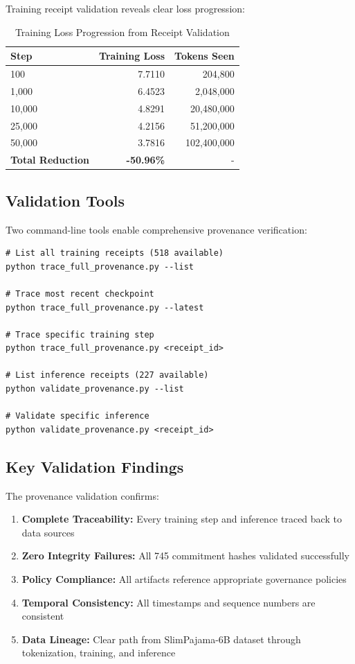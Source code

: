 \documentclass[11pt,a4paper]{article}
\begin{document}
Training receipt validation reveals clear loss progression:

\begin{table}[H]
\centering
\begin{tabular}{lrr}
\toprule
\textbf{Step} & \textbf{Training Loss} & \textbf{Tokens Seen} \\
\midrule
100 & 7.7110 & 204,800 \\
1,000 & 6.4523 & 2,048,000 \\
10,000 & 4.8291 & 20,480,000 \\
25,000 & 4.2156 & 51,200,000 \\
50,000 & 3.7816 & 102,400,000 \\
\midrule
\textbf{Total Reduction} & \textbf{-50.96\%} & - \\
\bottomrule
\end{tabular}
\caption{Training Loss Progression from Receipt Validation}
\label{tab:loss-progression}
\end{table}

\subsection{Validation Tools}

Two command-line tools enable comprehensive provenance verification:

\begin{lstlisting}[basicstyle=\small\ttfamily]
# List all training receipts (518 available)
python trace_full_provenance.py --list

# Trace most recent checkpoint
python trace_full_provenance.py --latest

# Trace specific training step
python trace_full_provenance.py <receipt_id>

# List inference receipts (227 available)
python validate_provenance.py --list

# Validate specific inference
python validate_provenance.py <receipt_id>
\end{lstlisting}

\subsection{Key Validation Findings}

The provenance validation confirms:

\begin{enumerate}
    \item \textbf{Complete Traceability:} Every training step and inference traced back to data sources
    \item \textbf{Zero Integrity Failures:} All 745 commitment hashes validated successfully
    \item \textbf{Policy Compliance:} All artifacts reference appropriate governance policies
    \item \textbf{Temporal Consistency:} All timestamps and sequence numbers are consistent
    \item \textbf{Data Lineage:} Clear path from SlimPajama-6B dataset through tokenization, training, and inference
\end{enumerate}
\end{document}
